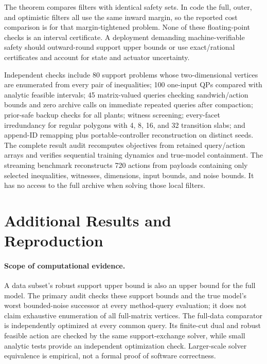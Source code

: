 \documentclass{l4dc2026}
\begin{document}
The theorem compares filters with identical safety sets. In code the full, outer, and optimistic filters all use the same inward margin, so the reported cost comparison is for that margin-tightened problem. None of these floating-point checks is an interval certificate. A deployment demanding machine-verifiable safety should outward-round support upper bounds or use exact/rational certificates and account for state and actuator uncertainty.

Independent checks include 80 support problems whose two-dimensional vertices are enumerated from every pair of inequalities; 100 one-input QPs compared with analytic feasible intervals; 45 matrix-valued queries checking sandwich/action bounds and zero archive calls on immediate repeated queries after compaction; prior-safe backup checks for all plants; witness screening; every-facet irredundancy for regular polygons with 4, 8, 16, and 32 transition slabs; and append-ID remapping plus portable-controller reconstruction on distinct seeds. The complete result audit recomputes objectives from retained query/action arrays and verifies sequential training dynamics and true-model containment. The streaming benchmark reconstructs 720 actions from payloads containing only selected inequalities, witnesses, dimensions, input bounds, and noise bounds. It has no access to the full archive when solving those local filters.

\section{Additional Results and Reproduction}\label{app:additional}



\paragraph{Scope of computational evidence.}
A data subset's robust support upper bound is also an upper bound for the full model. The primary audit checks these support bounds and the true model's worst bounded-noise successor at every method-query evaluation; it does not claim exhaustive enumeration of all full-matrix vertices. The full-data comparator is independently optimized at every common query. Its finite-cut dual and robust feasible action are checked by the same support-exchange solver, while small analytic tests provide an independent optimization check. Larger-scale solver equivalence is empirical, not a formal proof of software correctness.
\end{document}
